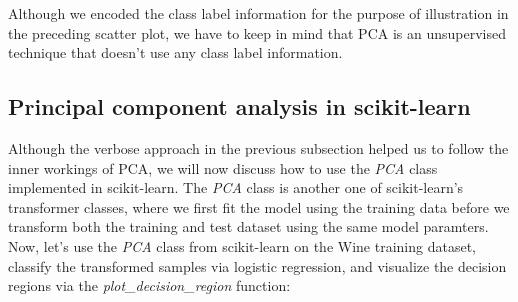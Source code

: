 \documentclass[11pt]{article}
\begin{document}
Although we encoded the class label information for the purpose of
illustration in the preceding scatter plot, we have to keep in mind that
PCA is an unsupervised technique that doesn't use any class label
information.

    \subsection{Principal component analysis in
scikit-learn}\label{principal-component-analysis-in-scikit-learn}

    Although the verbose approach in the previous subsection helped us to
follow the inner workings of PCA, we will now discuss how to use the
\emph{PCA} class implemented in scikit-learn. The \emph{PCA} class is
another one of scikit-learn's transformer classes, where we first fit
the model using the training data before we transform both the training
and test dataset using the same model paramters. Now, let's use the
\emph{PCA} class from scikit-learn on the Wine training dataset,
classify the transformed samples via logistic regression, and visualize
the decision regions via the \emph{plot\_decision\_region} function:
\end{document}
